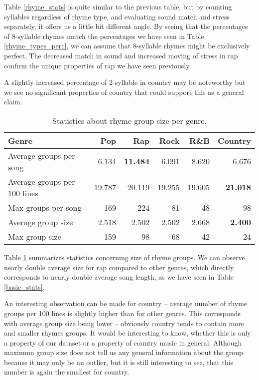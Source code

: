 Table \ref{rhyme_stats} is quite similar to the previous table, but by counting syllables regardless of rhyme type, and evaluating sound match and stress separately, it offers us a little bit different angle. By seeing that the percentages of 8-syllable rhymes match the percentages we have seen in Table \ref{rhyme_types_perc}, we can assume that 8-syllable rhymes might be exclusively perfect. The decreased match in sound and increased moving of stress in rap confirm the unique properties of rap we have seen previously.

A slightly increased percentage of 2-syllable in country may be noteworthy but we see no significant properties of country that could support this as a general claim.

\begin{table}[h!]
	\centering
	\begin{tabular}{l | r r r r r} 	
		Genre & 			Pop & 		Rap & 		Rock & 		R\&B & 		Country\\ 
		\midrule
		Average groups per song& 6.134 &\textbf{11.484} &6.091 &8.620 &6.676  \\
		Average groups per 100 lines &19.787 &20.119 &19.255 &19.605 &\textbf{21.018} \\
		Max groups per song & 169 &224 & 81 & 48 &98\\
		Average group size & 2.518 &2.502 &2.502 &2.668 &\textbf{2.400} \\
		Max group size & 159 &98 & 68 & 42 & 24\\
	\end{tabular}
	\caption{Statistics about rhyme group size per genre.} 
	\label{rhyme_group_size}
\end{table}

Table \ref{rhyme_group_size} summarizes statistics concerning size of rhyme groups. We can observe nearly double average size for rap compared to other genres, which directly corresponds to nearly double average song length, as we have seen in Table \ref{basic_stats}. 

An interesting observation can be made for country -- average number of rhyme groups per 100 lines is slightly higher than for other genres. This corresponds with average group size being lower -- obviously country tends to contain more and smaller rhymes groups. It would be interesting to know, whether this is only a property of our dataset or a property of country music in general. Although maximum group size does not tell us any general information about the group because it may only be an outlier, but it is still interesting to see, that this number is again the smallest for country.

